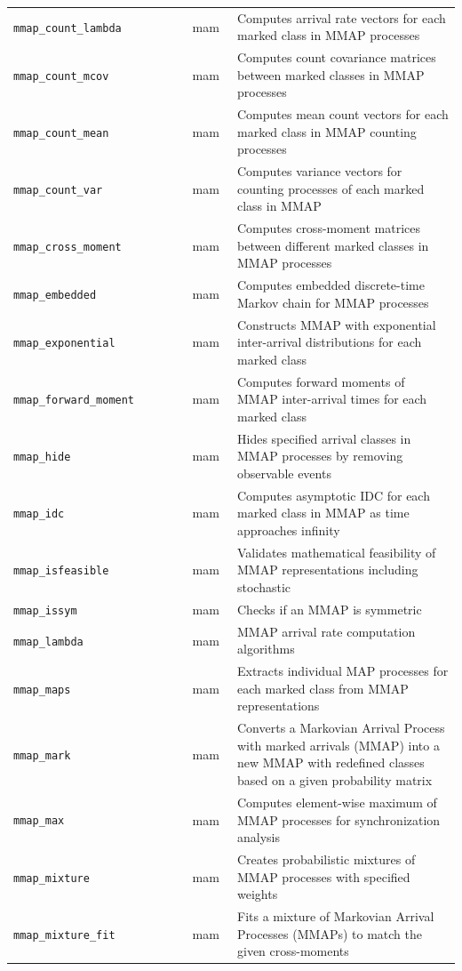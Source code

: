 \begin{footnotesize}
\begin{longtable}{|p{0.4\linewidth}|p{0.1\linewidth}|p{0.5\linewidth}|}
\texttt{mmap\_count\_lambda} & mam & Computes arrival rate vectors for each marked class in MMAP processes\\
\texttt{mmap\_count\_mcov} & mam & Computes count covariance matrices between marked classes in MMAP processes\\
\texttt{mmap\_count\_mean} & mam & Computes mean count vectors for each marked class in MMAP counting processes\\
\texttt{mmap\_count\_var} & mam & Computes variance vectors for counting processes of each marked class in MMAP\\
\texttt{mmap\_cross\_moment} & mam & Computes cross-moment matrices between different marked classes in MMAP processes\\
\texttt{mmap\_embedded} & mam & Computes embedded discrete-time Markov chain for MMAP processes\\
\texttt{mmap\_exponential} & mam & Constructs MMAP with exponential inter-arrival distributions for each marked class\\
\texttt{mmap\_forward\_moment} & mam & Computes forward moments of MMAP inter-arrival times for each marked class\\
\texttt{mmap\_hide} & mam & Hides specified arrival classes in MMAP processes by removing observable events\\
\texttt{mmap\_idc} & mam & Computes asymptotic IDC for each marked class in MMAP as time approaches infinity\\
\texttt{mmap\_isfeasible} & mam & Validates mathematical feasibility of MMAP representations including stochastic\\
\texttt{mmap\_issym} & mam & Checks if an MMAP is symmetric\\
\texttt{mmap\_lambda} & mam & MMAP arrival rate computation algorithms\\
\texttt{mmap\_maps} & mam & Extracts individual MAP processes for each marked class from MMAP representations\\
\texttt{mmap\_mark} & mam & Converts a Markovian Arrival Process with marked arrivals (MMAP) into a new MMAP with redefined classes based on a given probability matrix\\
\texttt{mmap\_max} & mam & Computes element-wise maximum of MMAP processes for synchronization analysis\\
\texttt{mmap\_mixture} & mam & Creates probabilistic mixtures of MMAP processes with specified weights\\
\texttt{mmap\_mixture\_fit} & mam & Fits a mixture of Markovian Arrival Processes (MMAPs) to match the given cross-moments\\

\end{longtable}
\end{footnotesize}
